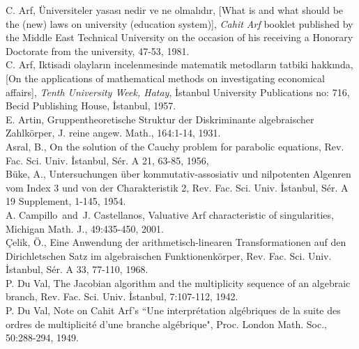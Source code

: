 \documentclass[12pt]{amsart}
\begin{document}
\begin{thebibliography}{10}
 C. Arf, \"{U}niversiteler yasas{\i} nedir ve ne olmal{\i}d{\i}r, [What is and what should be the (new) laws on university (education system)], \emph{Cahit Arf} booklet published by the Middle East Technical University on the occasion of his receiving a Honorary Doctorate from the university,  47-53, 1981. \\

 C. Arf, Iktisadi olaylar{\i}n incelenmesinde matematik metodlar{\i}n tatbiki hakk{\i}nda, [On the applications of mathematical methods on investigating economical affairs], \emph{Tenth University Week, Hatay}, {\.I}stanbul University Publications no: 716, Becid Publishing House, {\.I}stanbul, 1957.\\

 E. Artin, Gruppentheoretische Struktur der Diskriminante algebraischer Zahlk\"{o}rper, J. reine angew. Math., 164:1-14, 1931. \\

 Asral, B.,
On the solution of the Cauchy problem for parabolic equations,
Rev. Fac. Sci. Univ. {\.I}stanbul, S\'{e}r. A 21, 63-85, 1956, \\

B\"{u}ke, A., Untersuchungen \"{u}ber kommutativ-assosiativ und nilpotenten Algenren vom Index 3 und von der Charakteristik 2, Rev. Fac. Sci. Univ. {\.I}stanbul, S\'{e}r. A 19 Supplement, 1-145, 1954.
\\

 A. Campillo\ and\ J. Castellanos, Valuative Arf characteristic of singularities, Michigan Math. J., 49:435-450, 2001. \\

\c{C}elik, \"{O}., Eine Anwendung der arithmetisch-linearen Transformationen auf den Dirichletschen Satz im algebraischen Funktionenk\"{o}rper, Rev. Fac. Sci. Univ. {\.I}stanbul, S\'{e}r. A 33, 77-110, 1968. \\

 P. Du Val, The Jacobian algorithm and the multiplicity sequence of an algebraic branch,  Rev. Fac. Sci. Univ. {\.I}stanbul, 7:107-112, 1942. \\

 P. Du Val, Note on Cahit Arf's ``Une interpr\'{e}tation alg\'{e}briques de la suite des ordres de  multiplicit\'e d'une branche alg\'ebrique", Proc. London Math. Soc., 50:288-294, 1949.\\


\end{thebibliography}
\end{document}
